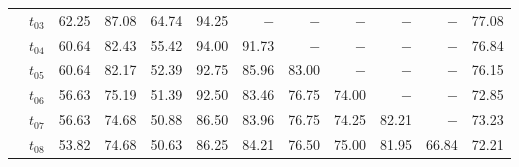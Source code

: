 \begin{table}[ht]
\begin{tabular}{@{}l l r r r r r r r r r r@{}}
 & $t_{03}$ & 62.25 & 87.08 & 64.74 & 94.25 & $-$ & $-$ & $-$ & $-$ & $-$ & 77.08 \\
 & $t_{04}$ & 60.64 & 82.43 & 55.42 & 94.00 & 91.73 & $-$ & $-$ & $-$ & $-$ & 76.84 \\
 & $t_{05}$ & 60.64 & 82.17 & 52.39 & 92.75 & 85.96 & 83.00 & $-$ & $-$ & $-$ & 76.15 \\
 & $t_{06}$ & 56.63 & 75.19 & 51.39 & 92.50 & 83.46 & 76.75 & 74.00 & $-$ & $-$ & 72.85 \\
 & $t_{07}$ & 56.63 & 74.68 & 50.88 & 86.50 & 83.96 & 76.75 & 74.25 & 82.21 & $-$ & 73.23 \\
 & $t_{08}$ & 53.82 & 74.68 & 50.63 & 86.25 & 84.21 & 76.50 & 75.00 & 81.95 & 66.84 & 72.21 \\
\bottomrule
\end{tabular}
\end{table}

